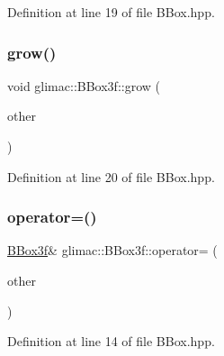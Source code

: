 Definition at line 19 of file B\+Box.\+hpp.

\mbox{\label{structglimac_1_1_b_box3f_a37342deeeba63916f701037ac1acc002}} 
\subsubsection{\texorpdfstring{grow()}{grow()}\hspace{0.1cm}{\footnotesize\ttfamily [2/2]}}
{\footnotesize\ttfamily void glimac\+::\+B\+Box3f\+::grow (\begin{DoxyParamCaption}\item[{const \hyperlink{group__core__types_ga1c47e8b3386109bc992b6c48e91b0be7}{glm\+::vec3} \&}]{other }\end{DoxyParamCaption})\hspace{0.3cm}{\ttfamily [inline]}}



Definition at line 20 of file B\+Box.\+hpp.

\mbox{\label{structglimac_1_1_b_box3f_aac86d7db2775def5999a06dd10da81c8}} 
\subsubsection{\texorpdfstring{operator=()}{operator=()}}
{\footnotesize\ttfamily \hyperlink{structglimac_1_1_b_box3f}{B\+Box3f}\& glimac\+::\+B\+Box3f\+::operator= (\begin{DoxyParamCaption}\item[{const \hyperlink{structglimac_1_1_b_box3f}{B\+Box3f} \&}]{other }\end{DoxyParamCaption})\hspace{0.3cm}{\ttfamily [inline]}}



Definition at line 14 of file B\+Box.\+hpp.

\mbox{\label{structglimac_1_1_b_box3f_aca6b2f64a4a904fe8b42a8121ee7f087}} 
